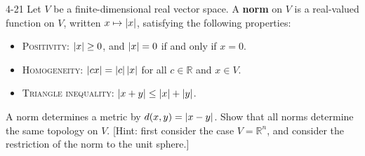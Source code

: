 \begin{problem}{4-21}
Let $V$ be a finite-dimensional real vector space. A \textbf{norm} on $V$ is a real-valued function on $V$, written $x\mapsto \left\vert{x}\right\vert$, satisfying the following properties:
\begin{itemize}
	\item \textsc{Positivity}: $\left\vert{x}\right\vert \geq 0$, and $\left\vert{x}\right\vert = 0$ if and only if $x = 0$.
	\item \textsc{Homogeneity}: $\left\vert{cx}\right\vert = \left\vert{c}\right\vert\left\vert{x}\right\vert$ for all $c\in \mathbb{R}$ and $x\in V$.
	\item \textsc{Triangle inequality}: $\left\vert{x + y}\right\vert \leq \left\vert{x}\right\vert + \left\vert{y}\right\vert$.
\end{itemize}

A norm determines a metric by $d(x, y) = \left\vert{x - y}\right\vert$. Show that all norms determine the same topology on $V$. [Hint: first consider the case $V = \mathbb{R}^{n}$, and consider the restriction of the norm to the unit sphere.]
\end{problem}

